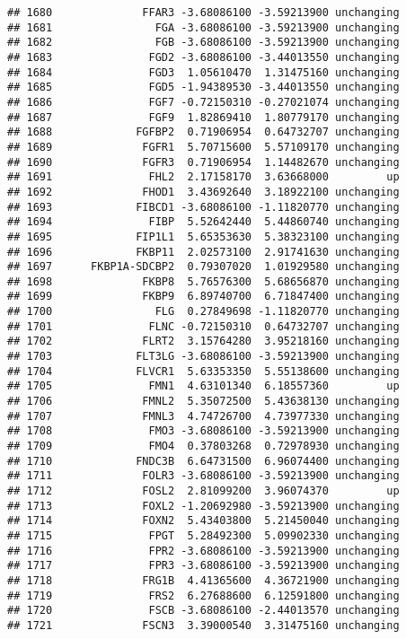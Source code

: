 \documentclass[]{article}
\begin{document}
\begin{verbatim}
## 1680              FFAR3 -3.68086100 -3.59213900 unchanging
## 1681                FGA -3.68086100 -3.59213900 unchanging
## 1682                FGB -3.68086100 -3.59213900 unchanging
## 1683               FGD2 -3.68086100 -3.44013550 unchanging
## 1684               FGD3  1.05610470  1.31475160 unchanging
## 1685               FGD5 -1.94389530 -3.44013550 unchanging
## 1686               FGF7 -0.72150310 -0.27021074 unchanging
## 1687               FGF9  1.82869410  1.80779170 unchanging
## 1688             FGFBP2  0.71906954  0.64732707 unchanging
## 1689              FGFR1  5.70715600  5.57109170 unchanging
## 1690              FGFR3  0.71906954  1.14482670 unchanging
## 1691               FHL2  2.17158170  3.63668000         up
## 1692              FHOD1  3.43692640  3.18922100 unchanging
## 1693             FIBCD1 -3.68086100 -1.11820770 unchanging
## 1694               FIBP  5.52642440  5.44860740 unchanging
## 1695             FIP1L1  5.65353630  5.38323100 unchanging
## 1696             FKBP11  2.02573100  2.91741630 unchanging
## 1697      FKBP1A-SDCBP2  0.79307020  1.01929580 unchanging
## 1698              FKBP8  5.76576300  5.68656870 unchanging
## 1699              FKBP9  6.89740700  6.71847400 unchanging
## 1700                FLG  0.27849698 -1.11820770 unchanging
## 1701               FLNC -0.72150310  0.64732707 unchanging
## 1702              FLRT2  3.15764280  3.95218160 unchanging
## 1703             FLT3LG -3.68086100 -3.59213900 unchanging
## 1704             FLVCR1  5.63353350  5.55138600 unchanging
## 1705               FMN1  4.63101340  6.18557360         up
## 1706              FMNL2  5.35072500  5.43638130 unchanging
## 1707              FMNL3  4.74726700  4.73977330 unchanging
## 1708               FMO3 -3.68086100 -3.59213900 unchanging
## 1709               FMO4  0.37803268  0.72978930 unchanging
## 1710             FNDC3B  6.64731500  6.96074400 unchanging
## 1711              FOLR3 -3.68086100 -3.59213900 unchanging
## 1712              FOSL2  2.81099200  3.96074370         up
## 1713              FOXL2 -1.20692980 -3.59213900 unchanging
## 1714              FOXN2  5.43403800  5.21450040 unchanging
## 1715               FPGT  5.28492300  5.09902330 unchanging
## 1716               FPR2 -3.68086100 -3.59213900 unchanging
## 1717               FPR3 -3.68086100 -3.59213900 unchanging
## 1718              FRG1B  4.41365600  4.36721900 unchanging
## 1719               FRS2  6.27688600  6.12591800 unchanging
## 1720               FSCB -3.68086100 -2.44013570 unchanging
## 1721              FSCN3  3.39000540  3.31475160 unchanging

\end{verbatim}
\end{document}
